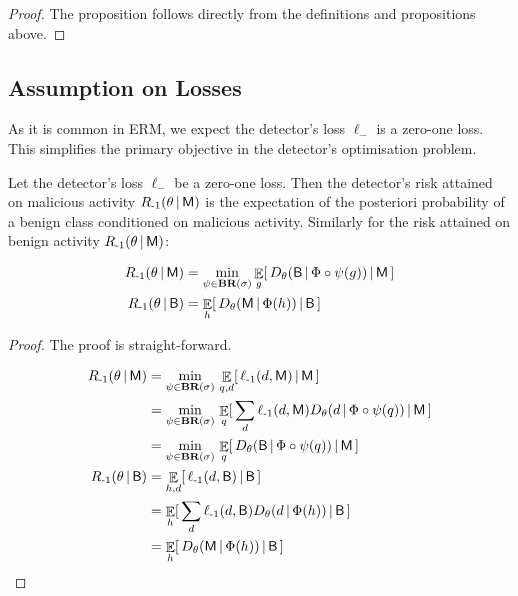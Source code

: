 \begin{proof}
 The proposition follows directly from the definitions and propositions above.
\end{proof}




\subsection{Assumption on Losses}
As it is common in ERM, we expect the detector's loss $\ell_\minus$ is a zero-one loss. This simplifies the primary objective in the detector's optimisation problem.

\begin{proposition}\label{prop:ben_loss}
    Let the detector's loss $\ell_\minus$ be a zero-one loss. Then the detector's risk attained on malicious activity $R_{{\text{-}1}}(\theta \,|\, \mathsf{M})$ is the expectation of the posteriori probability of a benign class conditioned on malicious activity. Similarly for the risk attained on benign activity $R_{{\text{-}1}}(\theta \,|\, \mathsf{M})$:

    \begin{align}
        R_{{\text{-}1}}(\theta \,|\, \mathsf{M}) &= \min_{\psi \in \textbf{BR}(\sigma)} \mathop{\mathbb{E}}_g [\, D_\theta(\mathsf{B} \,|\, \Phi \circ \psi (g)) \,|\, \mathsf{M} \,] \\
        R_{{\text{-}1}}(\theta \,|\, \mathsf{B}) &= \mathop{\mathbb{E}}_h [\, D_\theta(\mathsf{M} \,|\, \Phi (h)) \,|\, \mathsf{B} \,]
    \end{align}
\end{proposition}

\begin{proof}
    The proof is straight-forward.

    \begin{align}
        R_{{\text{-}1}}(\theta \,|\, \mathsf{M}) &= \min_{\psi \in \textbf{BR}(\sigma) } \,
            \mathop{\mathbb{E}}_{q, d} [\, \ell_{{\text{-}1}} (d, \mathsf{M}) \,|\, \mathsf{M} \,] \\
           &= \min_{\psi \in \textbf{BR}(\sigma) } \,
               \mathop{\mathbb{E}}_q [\, \sum_d \ell_{{\text{-}1}} (d, \mathsf{M}) D_\theta(d \,|\, \Phi \circ \psi(q)) \,|\, \mathsf{M} \,] \\
           &= \min_{\psi \in \textbf{BR}(\sigma) } \,
               \mathop{\mathbb{E}}_q [\, D_\theta(\mathsf{B} \,|\, \Phi \circ \psi(q)) \,|\, \mathsf{M} \,] \\
        R_{{\text{-}1}}(\theta \,|\, \mathsf{B}) &= \mathop{\mathbb{E}}_{h, d} [\, \ell_{{\text{-}1}} (d, \mathsf{B}) \,|\, \mathsf{B} \,] \\
           &= \mathop{\mathbb{E}}_h [\, \sum_d \ell_{{\text{-}1}} (d, \mathsf{B}) D_\theta(d \,|\, \Phi (h)) \,|\, \mathsf{B} \,] \\
           &= \mathop{\mathbb{E}}_h [\, D_\theta(\mathsf{M} \,|\, \Phi (h)) \,|\, \mathsf{B} \,]
    \end{align}

\end{proof}


